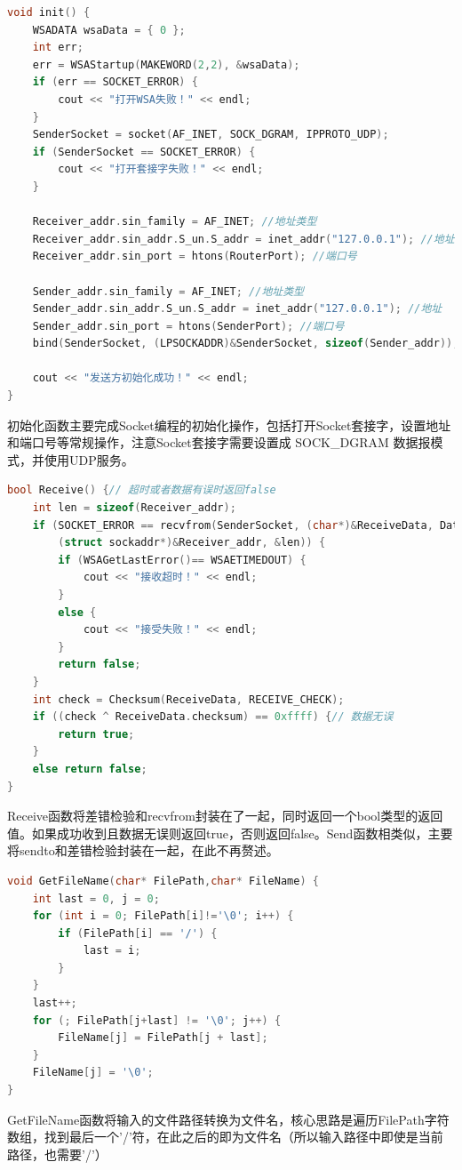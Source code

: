 \documentclass[UTF8,a4paper,10pt]{ctexart}
\begin{document}
\begin{lstlisting}[frame=trbl,language={C++}]
void init() {
    WSADATA wsaData = { 0 };
    int err;
    err = WSAStartup(MAKEWORD(2,2), &wsaData);
    if (err == SOCKET_ERROR) {
        cout << "打开WSA失败！" << endl;
    }
    SenderSocket = socket(AF_INET, SOCK_DGRAM, IPPROTO_UDP);
    if (SenderSocket == SOCKET_ERROR) {
        cout << "打开套接字失败！" << endl;
    }
    
    Receiver_addr.sin_family = AF_INET; //地址类型
    Receiver_addr.sin_addr.S_un.S_addr = inet_addr("127.0.0.1"); //地址
    Receiver_addr.sin_port = htons(RouterPort); //端口号

    Sender_addr.sin_family = AF_INET; //地址类型
    Sender_addr.sin_addr.S_un.S_addr = inet_addr("127.0.0.1"); //地址
    Sender_addr.sin_port = htons(SenderPort); //端口号
    bind(SenderSocket, (LPSOCKADDR)&SenderSocket, sizeof(Sender_addr));

    cout << "发送方初始化成功！" << endl;
}
\end{lstlisting}\par
初始化函数主要完成Socket编程的初始化操作，包括打开Socket套接字，设置地址和端口号等常规操作，注意Socket套接字需要设置成 SOCK\_DGRAM 数据报模式，并使用UDP服务。\par

\begin{lstlisting}[frame=trbl,language={C++}]
bool Receive() {// 超时或者数据有误时返回false
    int len = sizeof(Receiver_addr);
    if (SOCKET_ERROR == recvfrom(SenderSocket, (char*)&ReceiveData, DatagramLen, 0,
        (struct sockaddr*)&Receiver_addr, &len)) {
        if (WSAGetLastError()== WSAETIMEDOUT) {
            cout << "接收超时！" << endl;
        }
        else {
            cout << "接受失败！" << endl;
        }
        return false;
    }
    int check = Checksum(ReceiveData, RECEIVE_CHECK);
    if ((check ^ ReceiveData.checksum) == 0xffff) {// 数据无误
        return true;
    }
    else return false;
}
\end{lstlisting}\par
Receive函数将差错检验和recvfrom封装在了一起，同时返回一个bool类型的返回值。如果成功收到且数据无误则返回true，否则返回false。Send函数相类似，主要将sendto和差错检验封装在一起，在此不再赘述。\par

\begin{lstlisting}[frame=trbl,language={C++}]
void GetFileName(char* FilePath,char* FileName) {
    int last = 0, j = 0;
    for (int i = 0; FilePath[i]!='\0'; i++) {
        if (FilePath[i] == '/') {
            last = i;
        }
    }
    last++;
    for (; FilePath[j+last] != '\0'; j++) {
        FileName[j] = FilePath[j + last];
    }
    FileName[j] = '\0';
}
\end{lstlisting}\par
GetFileName函数将输入的文件路径转换为文件名，核心思路是遍历FilePath字符数组，找到最后一个'/'符，在此之后的即为文件名（所以输入路径中即使是当前路径，也需要'/'）
\end{document}
